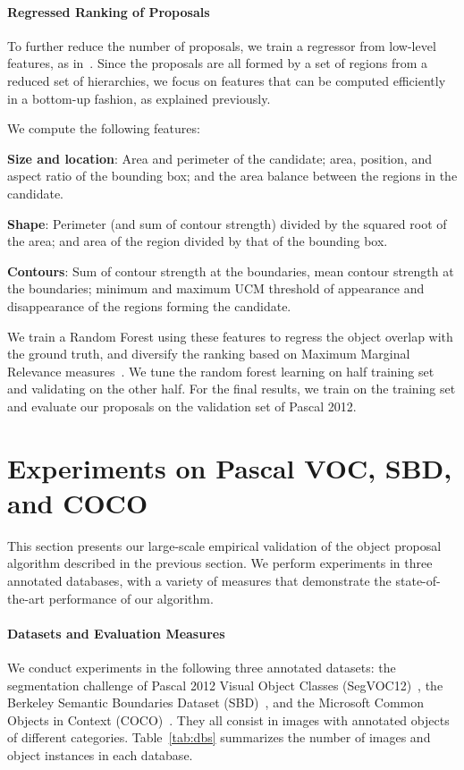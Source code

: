 \documentclass[10pt,journal,cspaper,compsoc]{IEEEtran}
\begin{document}
\paragraph*{\textbf{Regressed Ranking of Proposals}}
\label{sec:ranking}
To further reduce the number of proposals, we train a regressor from low-level features, as in~\cite{Carreira2012b}.
Since the proposals are all formed by a set of regions from a reduced set of hierarchies,
we focus on features that can be computed efficiently in a bottom-up fashion, as explained previously.

We compute the following features:
\begin{asparaitem}
\item\textbf{Size and location}: Area and perimeter of the candidate; area, position, and aspect ratio of the bounding box; and the
area balance between the regions in the candidate.
\item\textbf{Shape}: Perimeter (and sum of contour strength) divided by the squared root of the area; and
area of the region divided by that of the bounding box.
\item\textbf{Contours}: Sum of contour strength at the boundaries, mean contour strength at the boundaries; minimum and maximum UCM threshold of appearance and disappearance of the regions forming the candidate.
\end{asparaitem}
We train a Random Forest using these features to regress the object overlap with the ground truth, and
diversify the ranking based on Maximum Marginal Relevance measures~\cite{Carreira2012b}.
We tune the random forest learning on half training set and validating on the other half.
For the final results, we train on the training set and evaluate our proposals on the validation set of Pascal  2012.


\section{Experiments on Pascal VOC, SBD, and COCO}
This section presents our large-scale empirical validation of the object proposal algorithm described in the previous section.
We perform experiments in three annotated databases, with a variety of measures that demonstrate the state-of-the-art 
performance of our algorithm.

\label{sect:experim_prop}
\paragraph*{\textbf{Datasets and Evaluation Measures}}
We conduct experiments in the following three annotated datasets:
the segmentation challenge of Pascal 2012 Visual Object Classes (SegVOC12)~\cite{Everingham2012},
the Berkeley Semantic Boundaries Dataset (SBD)~\cite{Hariharan2011}, and the Microsoft Common Objects in Context (COCO)~\cite{Lin2014}.
They all consist in images with annotated objects of different categories.
Table~\ref{tab:dbs} summarizes the number of images and object instances in each database.
\end{document}
